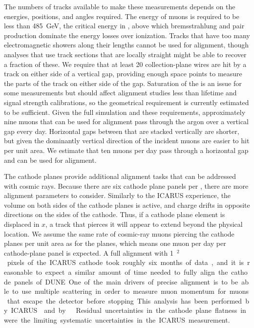 The numbers of tracks available to make these measurements depends on the energies, positions, and angles
required.  The energy of muons is required to be less than \SI{485}{\GeV}, the critical energy in ,
above which bremsstrahlung and pair production dominate the energy losses over ionization.  Tracks
that have too many electromagnetic showers along their lengths cannot be used for alignment, though
analyses that use track sections that are locally straight might be able to recover a fraction of these.
We require that at least \num{20} collection-plane wires are hit by a track on either side of a vertical gap, providing
enough space points to measure the parts of the track on either side of the gap.  Saturation of the 
is an issue for some measurements but should affect alignment studies less than lifetime and signal
strength calibrations, so the geometrical requirement is currently estimated to be sufficient.
Given the full simulation and these requirements, approximately nine muons that can be used for alignment
pass through the argon over a vertical gap every day.  Horizontal gaps between  that are stacked
vertically are shorter, but given the dominantly vertical direction of the incident muons are easier
to hit per unit area.  We estimate that ten muons per day pass through a horizontal gap and can be
used for alignment.

The cathode planes provide additional alignment tasks that can be addressed with cosmic rays.
Because there are six cathode plane panels per , there are more alignment parameters to consider.
Similarly to the ICARUS experience, the volume on both sides of the cathode planes is active, and charge
drifts in opposite directions on the sides of the cathode.  Thus, if a cathode plane element is displaced
in $x$, a track that pierces it will appear to extend beyond the physical location.  We assume the
same rate of cosmic-ray muons piercing the cathode planes per unit area as for the  planes, which
means one muon per day per cathode-plane panel is expected.  A full alignment with \SI{1}{\m$^2$} pixels of the
ICARUS cathode took roughly six months of data, and it is reasonable to expect a similar amount of time
needed to fully align the cathode panels of DUNE.

One of the main drivers of precise alignment is to be able to use multiple scattering in order to
measure muon momentum for muons that escape the detector before stopping.  
This analysis has been performed by ICARUS~\cite{Antonello:2016niy} and by ~\cite{Abratenko:2017nki}.
Residual uncertainties in the cathode plane flatness in were the limiting systematic uncertainties
in the ICARUS measurement.


